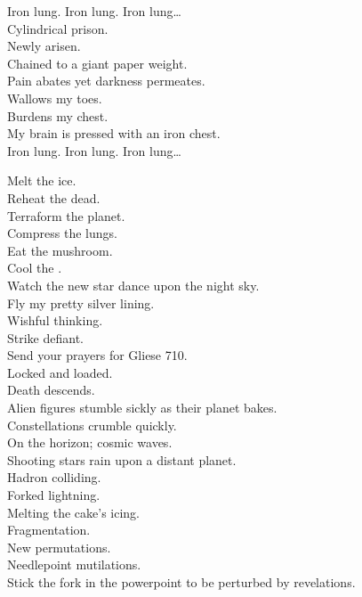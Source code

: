 Iron lung. Iron lung. Iron lung… \\

Cylindrical prison. \\
Newly arisen. \\
Chained to a giant paper weight. \\
Pain abates yet darkness permeates. \\
Wallows my toes. \\
Burdens my chest. \\
My brain is pressed with an iron chest. \\

Iron lung. Iron lung. Iron lung… \\




Melt the ice. \\
Reheat the dead. \\
Terraform the planet. \\
Compress the lungs. \\
Eat the mushroom. \\
Cool the . \\
Watch the new star dance upon the night sky. \\
Fly my pretty silver lining. \\
Wishful thinking. \\
Strike defiant. \\
Send your prayers for Gliese 710. \\
Locked and loaded. \\
Death descends. \\

Alien figures stumble sickly as their planet bakes. \\
Constellations crumble quickly. \\
On the horizon; cosmic waves. \\
Shooting stars rain upon a distant planet. \\
Hadron colliding. \\
Forked lightning. \\
Melting the cake's icing. \\

Fragmentation. \\
New permutations. \\
Needlepoint mutilations. \\
Stick the fork in the powerpoint to be perturbed by revelations. \\

